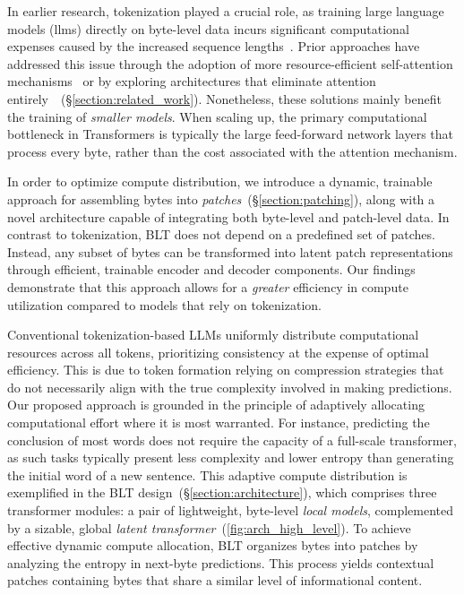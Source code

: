 In earlier research, tokenization played a crucial role, as training large language models (llms) directly on byte-level data incurs significant computational expenses caused by the increased sequence lengths~\citep{xue2022byt5}. Prior approaches have addressed this issue through the adoption of more resource-efficient self-attention mechanisms~\citep{el2020characterbert, clark2022canine} or by exploring architectures that eliminate attention entirely~\citep{wang2024mambabyte}~(\S\ref{section:related_work}). Nonetheless, these solutions mainly benefit the training of \textit{smaller models}. When scaling up, the primary computational bottleneck in Transformers is typically the large feed-forward network layers that process every byte, rather than the cost associated with the attention mechanism.

In order to optimize compute distribution, we introduce a dynamic, trainable approach for assembling bytes into \textit{patches}~(\S\ref{section:patching}), along with a novel architecture capable of integrating both byte-level and patch-level data. In contrast to tokenization, {\textsc BLT} does not depend on a predefined set of patches. Instead, any subset of bytes can be transformed into latent patch representations through efficient, trainable encoder and decoder components. Our findings demonstrate that this approach allows for a \textit{greater} efficiency in compute utilization compared to models that rely on tokenization.

Conventional tokenization-based LLMs uniformly distribute computational resources across all tokens, prioritizing consistency at the expense of optimal efficiency. This is due to token formation relying on compression strategies that do not necessarily align with the true complexity involved in making predictions. Our proposed approach is grounded in the principle of adaptively allocating computational effort where it is most warranted. For instance, predicting the conclusion of most words does not require the capacity of a full-scale transformer, as such tasks typically present less complexity and lower entropy than generating the initial word of a new sentence. This adaptive compute distribution is exemplified in the {\textsc BLT} design~(\S\ref{section:architecture}), which comprises three transformer modules: a pair of lightweight, byte-level \textit{local models}, complemented by a sizable, global \textit{latent transformer}~(\autoref{fig:arch_high_level}). To achieve effective dynamic compute allocation, {\textsc BLT} organizes bytes into patches by analyzing the entropy in next-byte predictions. This process yields contextual patches containing bytes that share a similar level of informational content.

